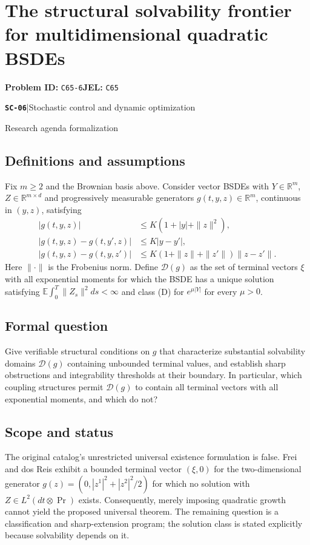 \documentclass[11pt,a4paper]{article}
\newcommand{\R}{\mathbb R}
\newcommand{\E}{\mathbb E}
\newcommand{\entrymeta}[3]{{\sffamily\small\color{muted}\textbf{\texttt{#1}}\quad|\quad #2\par #3\par}}
\begin{document}
\section*{The structural solvability frontier for multidimensional quadratic BSDEs}
\textbf{Problem ID:} \texttt{C65-6}\quad \textbf{JEL:} \texttt{C65}\par
\label{problem:OP-0567}
\label{beyond:SC-06}
\entrymeta{SC-06}{Stochastic control and dynamic optimization}{Research agenda formalization}
\subsection*{Definitions and assumptions}
Fix $m\geq2$ and the Brownian basis above. Consider vector BSDEs with
$Y\in\R^m$, $Z\in\R^{m\times d}$ and progressively measurable
generators $g(t,y,z)\in\R^m$, continuous in $(y,z)$, satisfying
\begin{align*}
 |g(t,y,z)|&\leq K(1+|y|+\|z\|^2),\\
 |g(t,y,z)-g(t,y',z)|&\leq K|y-y'|,\\
 |g(t,y,z)-g(t,y,z')|&\leq
 K(1+\|z\|+\|z'\|)\|z-z'\|.
\end{align*}
Here $\|\cdot\|$ is the Frobenius norm. Define $\mathcal D(g)$ as
the set of terminal vectors $\xi$ with all exponential moments for
which the BSDE has a unique solution satisfying
$\E\int_0^T\|Z_s\|^2ds<\infty$ and class (D) for
$e^{\mu|Y|}$ for every $\mu>0$.
\subsection*{Formal question}
Give verifiable structural conditions on $g$ that characterize substantial
solvability domains $\mathcal D(g)$ containing unbounded terminal values,
and establish sharp obstructions and integrability thresholds at their
boundary. In particular, which coupling structures permit
$\mathcal D(g)$ to contain all terminal vectors with all exponential
moments, and which do not?
\subsection*{Scope and status}
The original catalog's unrestricted universal existence formulation is
false. Frei and dos Reis exhibit a bounded terminal vector $(\xi,0)$
for the two-dimensional generator
$g(z)=(0,|z^1|^2+|z^2|^2/2)$ for which no solution with
$Z\in L^2(dt\otimes\Pr)$ exists. Consequently, merely imposing
quadratic growth cannot yield the proposed universal theorem. The
remaining question is a classification and sharp-extension program;
the solution class is stated explicitly because solvability depends on it.
\end{document}
